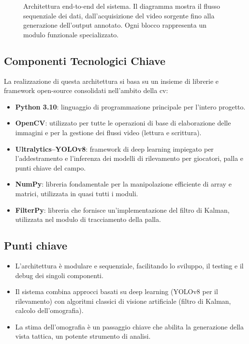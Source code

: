\documentclass[12pt,a4paper,openright,twoside]{book}
\begin{document}
\begin{figure}[h]
  \centering
  \caption{Architettura end-to-end del sistema. Il diagramma mostra il flusso sequenziale dei dati, dall'acquisizione del video sorgente fino alla generazione
  dell'output annotato. Ogni blocco rappresenta un modulo funzionale specializzato.}
  \label{fig:architettura}
\end{figure}

\subsection{Componenti Tecnologici Chiave}

La realizzazione di questa architettura si basa su un insieme di librerie e framework open-source consolidati 
nell'ambito della \ac{cv}:
\begin{itemize}
  \item \textbf{Python 3.10}: linguaggio di programmazione principale per l'intero progetto.
  \item \textbf{OpenCV}: utilizzato per tutte le operazioni di base di elaborazione delle immagini e per la gestione dei 
  flussi video (lettura e scrittura).
  \item \textbf{Ultralytics--YOLOv8}: framework di deep learning impiegato per l'addestramento e l'inferenza dei modelli di 
  rilevamento per giocatori, palla e punti chiave del campo.
  \item \textbf{NumPy}: libreria fondamentale per la manipolazione efficiente di array e matrici, utilizzata in quasi tutti i 
  moduli.
  \item \textbf{FilterPy}: libreria che fornisce un'implementazione del filtro di Kalman, utilizzata nel modulo di tracciamento 
  della palla.
\end{itemize}

\subsection*{Punti chiave}
\begin{itemize}
  \item L'architettura è modulare e sequenziale, facilitando lo sviluppo, il testing e il debug dei singoli componenti.
  \item Il sistema combina approcci basati su deep learning (YOLOv8 per il rilevamento) con algoritmi classici di 
  visione artificiale (filtro di Kalman, calcolo dell'omografia).
  \item La stima dell'omografia è un passaggio chiave che abilita la generazione della vista tattica, un potente 
  strumento di analisi.
\end{itemize}
\end{document}
